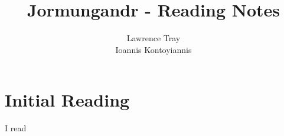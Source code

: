 \documentclass[]{article}
\title{Jormungandr - Reading Notes}
\author{Lawrence Tray \\ Ioannis Kontoyiannis}
\begin{document}
\maketitle

\section{Initial Reading}

I read \cite{Abbe}

\printbibliography
\end{document}
